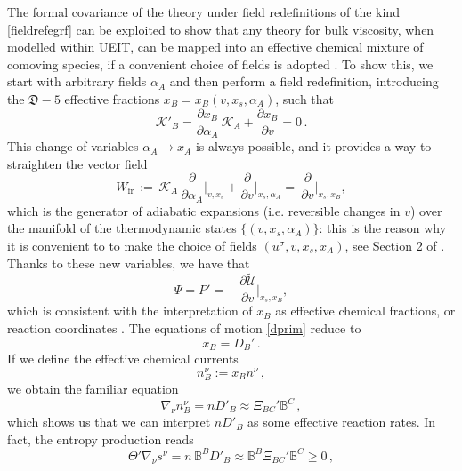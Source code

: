 \documentclass[a4paper, amsfonts, amssymb, amsmath, reprint, twocolumn, showkeys, nofootinbib]{revtex4-2}
\begin{document}
The formal covariance of the theory under field redefinitions of the kind \eqref{fieldrefegrf} can be exploited to show that any theory for bulk viscosity, when modelled within UEIT, can be mapped into an effective chemical mixture of comoving species, if a convenient choice of fields is adopted \citep{BulkGavassino}. 
To show this, we start with arbitrary fields $\alpha_A$ and then perform a field redefinition, introducing the $\mathfrak{D}-5$ effective fractions $x_B = x_B(v,x_s,\alpha_A)$, such that
\begin{equation}
\mathcal{K}'_B = \dfrac{\partial x_B}{\partial \alpha_A} \, \mathcal{K}_A + \dfrac{\partial x_B}{\partial v} =0 \, .
\end{equation}
This change of variables $\alpha_A \rightarrow x_A$ is always possible, and it provides a way to straighten the vector field 
\begin{equation}
W_{\text{fr}} \, := \,  
\mathcal{K}_A \, \dfrac{\partial}{\partial \alpha_A}\bigg|_{v,x_s} + \dfrac{\partial}{\partial v} \bigg|_{x_s,\alpha_A}
 = \,  \dfrac{\partial}{\partial v} \bigg|_{x_s,x_B} ,
\end{equation} 
which is the generator of adiabatic expansions (i.e. reversible changes in $v$) over the manifold of the thermodynamic states $\{(v,x_s,\alpha_A)\}$: this is the reason why it is convenient to to make the choice of fields $(u^\sigma,v,x_s,x_A)$, see Section 2 of \citep{BulkGavassino}. 
Thanks to these new variables, we have that
\begin{equation}
\Psi = P' = - \, \dfrac{\partial \tilde{\mathcal{U}}}{\partial v} \bigg|_{x_s,x_B}  ,
\end{equation}
which is consistent with the interpretation of $x_B$ as effective chemical fractions, or reaction coordinates \citep{prigoginebook}. The equations of motion \eqref{dprim} reduce to
\begin{equation}
\dot{x}_B = D_B' \, .
\end{equation}
If we define the effective chemical currents
\begin{equation}
n_B^\nu := x_B n^\nu \, ,
\end{equation}
we obtain the familiar equation
\begin{equation}
\nabla_\nu n_B^\nu = nD'_B \approx \Xi_{BC}' \mathbb{B}^C \, ,
\end{equation}
which shows us that we can interpret $nD'_B$ as some effective reaction rates. In fact, the entropy production reads
\begin{equation}
\Theta' \nabla_\nu s^\nu = n \, \mathbb{B}^B D'_B \approx \mathbb{B}^B \Xi_{BC}'\mathbb{B}^C \geq 0 \, , 
\end{equation}
\end{document}
